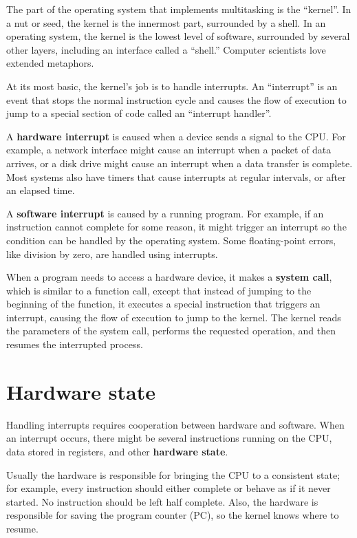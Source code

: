 \documentclass[12pt]{book}
\begin{document}
{The part of the operating system that implements multitasking is
the ``kernel''.  In a nut or seed, the kernel is the innermost
part, surrounded by a shell.  In an operating system, the kernel
is the lowest level of software, surrounded by several other
layers, including an interface called a ``shell.''  Computer
scientists love extended metaphors.

At its most basic, the kernel's job is to
handle interrupts.  An ``interrupt'' is an event that stops the
normal instruction cycle and causes the flow of execution to jump to a
special section of code called an ``interrupt handler''.


A {\bf hardware interrupt} is caused when a device sends a signal to the
CPU.  For example, a network interface might cause an interrupt when
a packet of data arrives, or a disk drive might cause an interrupt
when a data transfer is complete.  Most systems also have timers that
cause interrupts at regular intervals, or after an elapsed time.

A {\bf software interrupt} is caused by a running program.  For example, if
an instruction cannot complete for some reason, it might trigger an
interrupt so the condition can be handled by the operating system.
Some floating-point errors, like division by zero, are handled
using interrupts.

When a program needs to access a hardware device,
it makes a {\bf system call}, which is similar to a function call,
except that instead of jumping to the beginning of the function,
it executes a special instruction that triggers an interrupt, causing
the flow of execution to jump to the kernel.  The kernel reads the
parameters of the system call, performs the requested operation,
and then resumes the interrupted process.


\section{Hardware state}

Handling interrupts requires cooperation between hardware and
software.  When an interrupt occurs, there might be several
instructions running on the CPU, data stored in registers, and
other {\bf hardware state}.

Usually the hardware is responsible for bringing the CPU
to a consistent state; for example, every instruction should either
complete or behave as if it never started.  No instruction should
be left half complete.  Also, the hardware is responsible for
saving the program counter (PC), so the kernel knows where to
resume.

}
\end{document}
